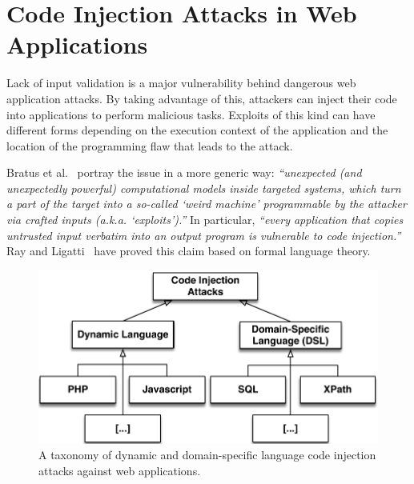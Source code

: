 \documentclass[10pt,journal,compsoc]{IEEEtran}
\begin{document}

\section{Code Injection Attacks in Web Applications}
\label{sec:attacks}

Lack of input validation is a major vulnerability behind dangerous web
application attacks. By taking advantage of this, attackers can inject
their code into applications to perform malicious tasks. Exploits of
this kind can have different forms depending on the execution context
of the application and the location of the programming flaw that leads
to the attack.

Bratus et al.~\cite{BLSPS11} portray the issue in a more generic way:
{\it ``unexpected (and unexpectedly powerful) computational models
  inside targeted systems, which turn a part of the target into a
  so-called `weird machine' programmable by the attacker via crafted
  inputs (a.k.a. `exploits').''} In particular, {\it ``every
  application that copies untrusted input verbatim into an output
  program is vulnerable to code injection.''} Ray and
Ligatti~\cite{RL12b} have proved this claim based on formal language
theory.

\begin{figure}
\begin{center}
\leavevmode
\includegraphics[scale=0.55]{attack-tree-uml.pdf}
\end{center}
\caption{\label{fig:taxonomy}A taxonomy of dynamic and domain-specific
language code injection attacks against web applications.}
\end{figure}
\end{document}
